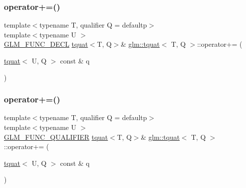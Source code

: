 \subsubsection{\texorpdfstring{operator+=()}{operator+=()}\hspace{0.1cm}{\footnotesize\ttfamily [1/2]}}
{\footnotesize\ttfamily template$<$typename T, qualifier Q = defaultp$>$ \\
template$<$typename U $>$ \\
\hyperlink{setup_8hpp_ab2d052de21a70539923e9bcbf6e83a51}{G\+L\+M\+\_\+\+F\+U\+N\+C\+\_\+\+D\+E\+CL} \hyperlink{structglm_1_1tquat}{tquat}$<$T, Q$>$\& \hyperlink{structglm_1_1tquat}{glm\+::tquat}$<$ T, Q $>$\+::operator+= (\begin{DoxyParamCaption}\item[{\hyperlink{structglm_1_1tquat}{tquat}$<$ U, Q $>$ const \&}]{q }\end{DoxyParamCaption})}

\mbox{\label{structglm_1_1tquat_afe4fd15b1ec1080a813466f1ab3509c5}} 
\subsubsection{\texorpdfstring{operator+=()}{operator+=()}\hspace{0.1cm}{\footnotesize\ttfamily [2/2]}}
{\footnotesize\ttfamily template$<$typename T, qualifier Q = defaultp$>$ \\
template$<$typename U $>$ \\
\hyperlink{setup_8hpp_a33fdea6f91c5f834105f7415e2a64407}{G\+L\+M\+\_\+\+F\+U\+N\+C\+\_\+\+Q\+U\+A\+L\+I\+F\+I\+ER} \hyperlink{structglm_1_1tquat}{tquat}$<$T, Q$>$\& \hyperlink{structglm_1_1tquat}{glm\+::tquat}$<$ T, Q $>$\+::operator+= (\begin{DoxyParamCaption}\item[{\hyperlink{structglm_1_1tquat}{tquat}$<$ U, Q $>$ const \&}]{q }\end{DoxyParamCaption})}

\mbox{\label{structglm_1_1tquat_a1f48d26214f6efcb8f1c6a222e45fae1}} 
